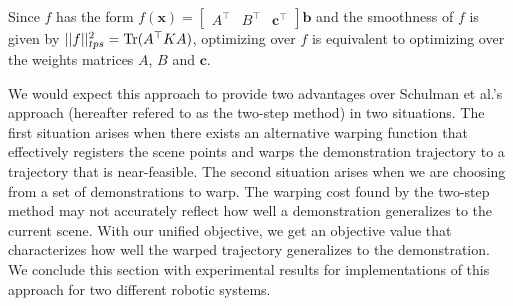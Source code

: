 Since $f$ has the form
$f(\mathbf{x}) = 
\begin{bmatrix}
A^\top &
B^\top &
\mathbf{c}^\top
\end{bmatrix}
\mathbf{b}$
and the smoothness of $f$ is given by
$||f||_{tps}^2 = \operatorname{Tr}(A^\top K A)$,
optimizing over $f$ is equivalent to optimizing over the weights matrices $A$, $B$ and $\mathbf{c}$.


We would expect this approach to provide two advantages over Schulman et al.'s approach (hereafter refered to as the two-step method) in two situations. The first situation arises when there exists an alternative warping function that effectively registers the scene points and warps the demonstration trajectory to a trajectory that is near-feasible. The second situation arises when we are choosing from a set of demonstrations to warp. The warping cost found by the two-step method may not accurately reflect how well a demonstration generalizes to the current scene. With our unified objective, we get an objective value that characterizes how well the warped trajectory generalizes to the demonstration. We conclude this section with experimental results for implementations of this approach for two different robotic systems. 
